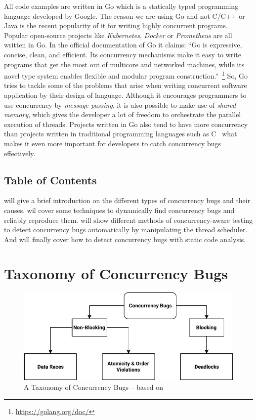 \documentclass[conference]{IEEEtran}
\begin{document}
All code examples are written in Go which is a statically typed programming language developed by Google.
The reason we are using Go and not C/C++ or Java is the recent popularity of it for writing highly concurrent programs.
Popular open-source projects like \emph{Kubernetes}, \emph{Docker} or \emph{Prometheus} are all written in Go.
In the official documentation of Go it claims: ``Go is expressive, concise, clean, and efficient. Its concurrency mechanisms make it easy to write programs that get the most out of multicore and networked machines, while its novel type system enables flexible and modular program construction.''~\footnote{\url{https://golang.org/doc/}}
So, Go tries to tackle some of the problems that arise when writing concurrent software application by their design of language.
Although it encourages programmers to use concurrency by \emph{message passing}, it is also possible to make use of \emph{shared memory}, which gives the developer a lot of freedom to orchestrate the parallel execution of threads.
Projects written in Go also tend to have more concurrency than projects written in traditional programming languages such as C~\cite{tu2019go} what makes it even more important for developers to catch concurrency bugs effectively.

\subsection{Table of Contents}

 will give a brief introduction on the different types of concurrency bugs and their causes.
 wil cover some techniques to dynamically find concurrency bugs and reliably reproduce them.
 will show different methods of concurrency-aware testing to detect concurrency bugs automatically by manipulating the thread scheduler.
And  will finally cover how to detect concurrency bugs with static code analysis.

\section{Taxonomy of Concurrency Bugs}
\label{sct:taxonomy}

\begin{figure}
    \includegraphics[width=\linewidth]{figures/ConcurrencyBugClasses.pdf}
    \caption{A Taxonomy of Concurrency Bugs -- based on\cite{tchamgoue2012testing}}
    \label{fig:classes}
\end{figure}
\end{document}
